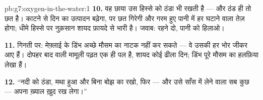 \begin{solution}{pb:g7:oxygen-in-the-water:1}
\textbf{10.} वह छाया उस हिस्से को ठंडा भी रखती है --- और ठंड ही तो छत
है। काटने से दिन का उत्पादन बढ़ेगा, पर छत गिरेगी और गरम हुए पानी में हर
घटाने वाला तेज़ होगा; धीमे हिस्से पर नुक़सान शायद फ़ायदे से भारी है।
जवाब:  रहने दो, पानी को हिलाओ।

\textbf{11.} गिनती पर: मेफ़्लाई के डिंभ अच्छे मौसम का नाटक नहीं कर सकते
--- वे उसकी हर भोर जीकर आए हैं। दोपहर बाद वाली मामूली पढ़त एक ही पल है,
शायद कोई ढीला दिन; डिंभ पूरे मौसम का हलफ़िया लेखा हैं।

\textbf{12.} ``नदी को ठंडा, मथा हुआ और बिना बोझ का रखो, फिर  ---
और उसे साँस में लेने वाला सब कुछ --- अपना ख़्याल ख़ुद रख लेगा।''
\end{solution}
